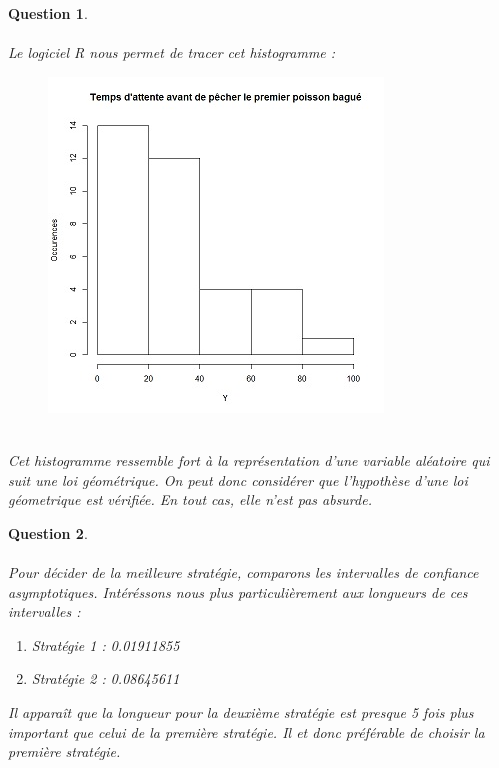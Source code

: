 \documentclass[a4paper,11pt]{article}
\newtheorem{exo3}{Question}
\begin{document}
\begin{exo3} \ \\ \\
Le logiciel R nous permet de tracer cet histogramme :  \ \\
\begin{figure}[h]
\includegraphics[scale=1.2]{images/Histogramme_de_Y_avec_regroupement.jpeg}
\end{figure} \ \\
Cet histogramme ressemble fort à la représentation d'une variable aléatoire qui suit une loi géométrique. On peut donc considérer que l'hypothèse d'une loi géometrique est vérifiée. En tout cas, elle n'est pas absurde.
\end{exo3}

\begin{exo3} \ \\ \\
Pour décider de la meilleure stratégie, comparons les intervalles de confiance asymptotiques. Intéréssons nous plus particulièrement aux longueurs de ces intervalles : 
\begin{enumerate}
    \item Stratégie 1 : 0.01911855
    \item Stratégie 2 : 0.08645611
\end{enumerate}

Il apparaît que la longueur pour la deuxième stratégie est presque 5 fois plus important que celui de la première stratégie. \newline \newline Il et donc préférable de choisir la première stratégie.
\end{exo3}
\end{document}

